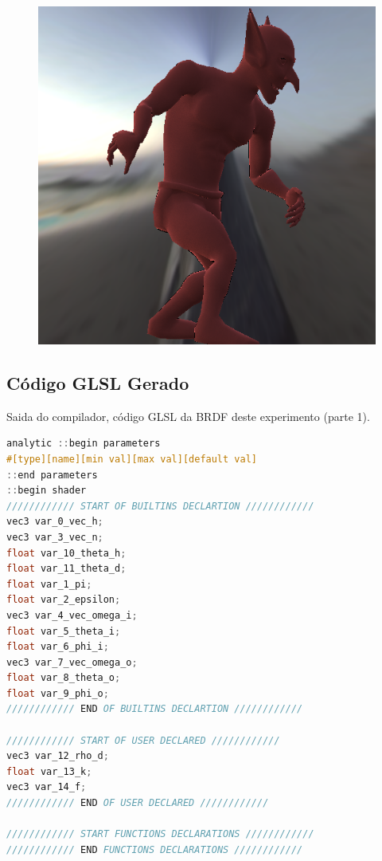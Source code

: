 \begin{figure}[H]
\endminipage\hfill
{}%
  \includegraphics[width=\linewidth]{./Imagens/brdfs/minnaert-goblin.png}
\endminipage
\end{figure}

\subsection{Código GLSL Gerado}
\begin{codigo}[H]
    \caption{\small Saida do compilador, código GLSL da BRDF deste experimento (parte 1). }
    \label{cod-minnaert-glsl-pt-1}
\begin{lstlisting}[language=C, inputencoding=utf8]
analytic ::begin parameters
#[type][name][min val][max val][default val]
::end parameters
::begin shader
//////////// START OF BUILTINS DECLARTION ////////////
vec3 var_0_vec_h;
vec3 var_3_vec_n;
float var_10_theta_h;
float var_11_theta_d;
float var_1_pi;
float var_2_epsilon;
vec3 var_4_vec_omega_i;
float var_5_theta_i;
float var_6_phi_i;
vec3 var_7_vec_omega_o;
float var_8_theta_o;
float var_9_phi_o;
//////////// END OF BUILTINS DECLARTION ////////////

//////////// START OF USER DECLARED ////////////
vec3 var_12_rho_d;
float var_13_k;
vec3 var_14_f;
//////////// END OF USER DECLARED ////////////

//////////// START FUNCTIONS DECLARATIONS ////////////
//////////// END FUNCTIONS DECLARATIONS ////////////
\end{lstlisting}
\end{codigo}


